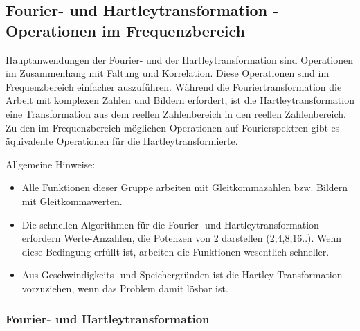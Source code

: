 
\subsection{Fourier- und Hartleytransformation - Operationen im Frequenzbereich}

Hauptanwendungen der Fourier- und der Hartleytransformation sind 
Operationen im Zusammenhang mit Faltung und Korrelation. Diese 
Operationen sind im Frequenzbereich einfacher auszuführen. Während
die Fouriertransformation die Arbeit mit komplexen Zahlen und Bildern
erfordert, ist die Hartleytransformation eine Transformation aus dem
reellen Zahlenbereich in den reellen Zahlenbereich. Zu den im 
Frequenzbereich möglichen Operationen auf Fourierspektren gibt es 
äquivalente Operationen für die Hartleytransformierte.

\vspace{1em}
\noindent Allgemeine Hinweise:
\begin{itemize}
\item Alle Funktionen dieser Gruppe arbeiten mit Gleitkommazahlen bzw.
Bildern mit Gleitkommawerten.
\item Die schnellen Algorithmen für die Fourier- und Hartleytransformation
erfordern Werte-Anzahlen, die Potenzen von 2 darstellen (2,4,8,16..).
Wenn diese Bedingung erfüllt ist, arbeiten die Funktionen wesentlich 
schneller.
\item Aus Geschwindigkeits- und Speichergründen ist die Hartley-Transformation
vorzuziehen, wenn das Problem damit lösbar ist.
\end{itemize}


\subsubsection{Fourier- und Hartleytransformation}



